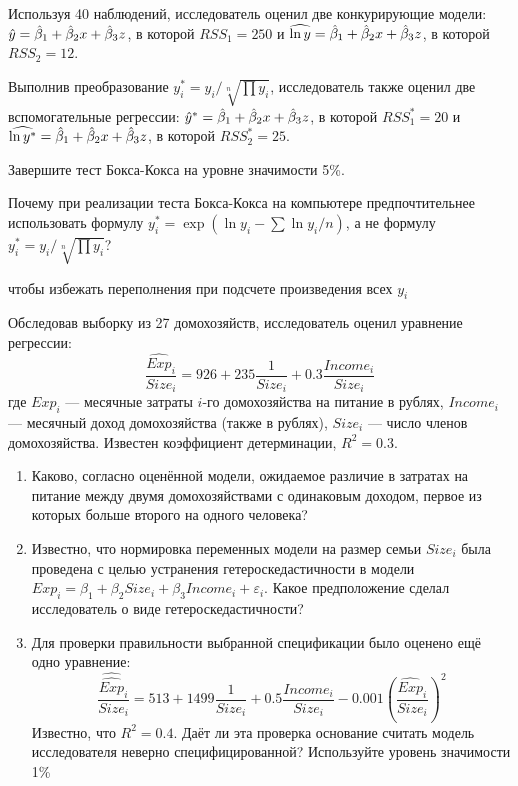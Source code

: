 \documentclass[pdftex,11pt,openany]{book}\usepackage[]{graphicx}\usepackage[]{color}
\begin{document}
\begin{solution}
\end{solution}

\begin{problem}
Используя 40 наблюдений, исследователь оценил две конкурирующие модели: $\hat{y}=\hat{\beta}_1+\hat{\beta}_2 x +\hat{\beta}_3 z$, в которой $RSS_1=250$ и $\widehat{\ln y}=\hat{\beta}_1+\hat{\beta}_2 x +\hat{\beta}_3 z$, в которой $RSS_2=12$. 

Выполнив преобразование $y^*_i=y_i/\sqrt[n]{\prod y_i}$, исследователь также оценил две вспомогательные регрессии: $\hat{y}^*=\hat{\beta}_1+\hat{\beta}_2 x +\hat{\beta}_3 z$, в которой $RSS^*_1=20$ и $\widehat{\ln y^*}=\hat{\beta}_1+\hat{\beta}_2 x +\hat{\beta}_3 z$, в которой $RSS^*_2=25$.

Завершите тест Бокса-Кокса на уровне значимости 5\%.
\end{problem}

\begin{solution}
\end{solution}

\begin{problem}
Почему при реализации теста Бокса-Кокса на компьютере предпочтительнее использовать формулу $y^*_i=\exp(\ln y_i - \sum \ln y_i /n) $, а не формулу $y^*_i=y_i/\sqrt[n]{\prod y_i}$?
\end{problem}

\begin{solution}
чтобы избежать переполнения при подсчете произведения всех $y_i$
\end{solution}


\begin{problem}
Обследовав выборку из 27 домохозяйств, исследователь оценил уравнение регрессии:
\[
\frac{\widehat{Exp}_i}{Size_i}=926+235\frac{1}{Size_i}+0.3\frac{Income_i}{Size_i}
\]
где $Exp_i$ --- месячные затраты $i$-го домохозяйства на питание в рублях, $Income_i$ --- месячный доход домохозяйства (также в рублях),  $Size_i$ --- число членов домохозяйства. Известен коэффициент детерминации, $R^2=0.3$.

\begin{enumerate}
\item Каково, согласно оценённой модели, ожидаемое различие в затратах на питание между двумя домохозяйствами с одинаковым доходом, первое из которых больше второго на одного человека?
\item Известно, что нормировка переменных модели на размер семьи $Size_i$ была проведена с целью устранения гетероскедастичности в модели $Exp_i=\beta_1+\beta_2 Size_i+\beta_3 Income_i+\varepsilon_i$. Какое предположение сделал исследователь о виде гетероскедастичности?
\item Для проверки правильности выбранной спецификации было оценено ещё одно уравнение:
\[
\frac{\widehat{\widehat{Exp}}_i}{Size_i}=513+1499\frac{1}{Size_i}+0.5\frac{Income_i}{Size_i}-0.001\left(\frac{\widehat{Exp}_i}{Size_i}\right)^2
\]
Известно, что $R^2=0.4$. Даёт ли эта проверка основание считать модель исследователя неверно специфицированной? Используйте уровень значимости 1\%
\end{enumerate}
\end{problem}
\end{document}
